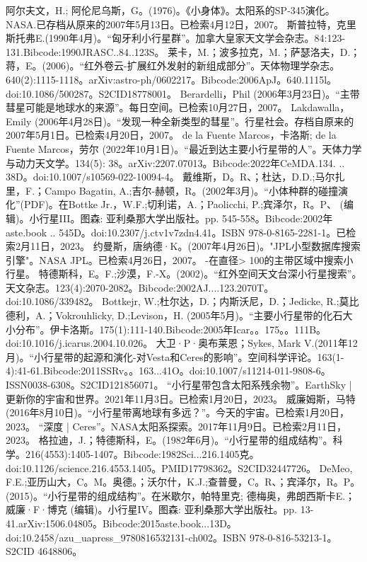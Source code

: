 \begin{enumerate}
 阿尔夫文，H.; 阿伦尼乌斯，G。(1976)。《小身体》。太阳系的SP-345演化。NASA.已存档从原来的2007年5月13日。已检索4月12日，2007。
 斯普拉特，克里斯托弗E.(1990年4月)。“匈牙利小行星群”。加拿大皇家天文学会杂志。84:123-131.Bibcode:1990JRASC..84..123S。
 莱卡，M.；波多拉克，M.；萨瑟洛夫，D.；蒋，E。(2006)。“红外卷云-扩展红外发射的新组成部分”。天体物理学杂志。640(2):1115-1118。arXiv:astro-ph/0602217。Bibcode:2006ApJ。640.1115l。doi:10.1086/500287。S2CID18778001。 
 Berardelli，Phil (2006年3月23日)。“主带彗星可能是地球水的来源”。每日空间。已检索10月27日，2007。
 Lakdawalla，Emily (2006年4月28日)。“发现一种全新类型的彗星”。行星社会。存档自原来的2007年5月1日。已检索4月20日，2007。
 de la Fuente Marcos，卡洛斯; de la Fuente Marcos，劳尔 (2022年10月1日)。“最近到达主要小行星带的人”。天体力学与动力天文学。134(5): 38。arXiv:2207.07013。Bibcode:2022年CeMDA.134. .. 38D。doi:10.1007/s10569-022-10094-4。
 戴维斯，D。R、；杜达，D.D.;马尔扎里，F.；Campo Bagatin, A.;吉尔-赫顿，R。(2002年3月)。“小体种群的碰撞演化”(PDF)。在Bottke Jr.，W.F.;切利诺，A.；Paolicchi, P.;宾泽尔，R。P、 (编辑)。小行星III。图森: 亚利桑那大学出版社。pp. 545-558。Bibcode:2002年aste.book .. 545D。doi:10.2307/j.ctv1v7zdn4.41。ISBN  978-0-8165-2281-1。已检索2月11日，2023。
 约曼斯，唐纳德·K。(2007年4月26日)。"JPL小型数据库搜索引擎"。NASA JPL。已检索4月26日，2007。 -在直径> 100的主带区域中搜索小行星。
 特德斯科，E。F.;沙漠，F.-X。(2002)。“红外空间天文台深小行星搜索”。天文杂志。123(4):2070-2082。Bibcode:2002AJ....123.2070T。doi:10.1086/339482。
 Bottkejr, W.;杜尔达，D.；内斯沃尼，D.；Jedicke, R.;莫比德利，A.；Vokrouhlicky, D.;Levison，H. (2005年5月)。“主要小行星带的化石大小分布”。伊卡洛斯。175(1):111-140.Bibcode:2005年Icar。。175。。111B。doi:10.1016/j.icarus.2004.10.026。
 大卫·P·奥布莱恩；Sykes, Mark V.(2011年12月)。“小行星带的起源和演化-对Vesta和Ceres的影响”。空间科学评论。163(1-4):41-61.Bibcode:2011SSRv。。163...41O。doi:10.1007/s11214-011-9808-6。ISSN0038-6308。S2CID121856071。  
 “小行星带包含太阳系残余物”。EarthSky | 更新你的宇宙和世界。2021年11月3日。已检索1月20日，2023。
 威廉姆斯，马特 (2016年8月10日)。“小行星带离地球有多远？”。今天的宇宙。已检索1月20日，2023。
 “深度 | Ceres”。NASA太阳系探索。2017年11月9日。已检索2月11日，2023。
 格拉迪，J.；特德斯科，E。(1982年6月)。“小行星带的组成结构”。科学。216(4553):1405-1407。Bibcode:1982Sci...216.1405克。doi:10.1126/science.216.4553.1405。PMID17798362。S2CID32447726。  
 DeMeo, F.E.;亚历山大，C。M。奥德。；沃尔什，K.J.;查普曼，C。R、；宾泽尔，R。P。(2015)。“小行星带的组成结构”。在米歇尔，帕特里克; 德梅奥，弗朗西斯卡E.；威廉·F·博克 (编辑)。小行星IV。图森: 亚利桑那大学出版社。pp. 13-41.arXiv:1506.04805。Bibcode:2015aste.book...13D。doi:10.2458/azu_uapress_9780816532131-ch002。ISBN 978-0-816-53213-1。S2CID 4648806。

\end{enumerate}
